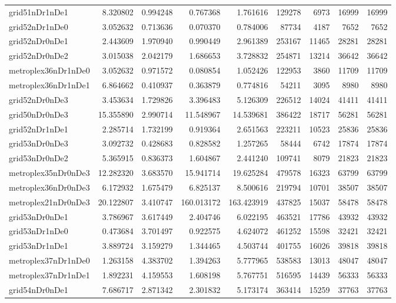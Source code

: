 \documentclass[../../../thesis.tex]{subfiles}
\begin{document}
\begin{longtable}{|l|r|r|r|r|r|r|r|r|}
grid51nDr1nDe1 & 8.320802 & 0.994248 & 0.767368 & 1.761616 & 129278 & 6973 & 16999 & 16999 \\
grid52nDr1nDe0 & 3.052632 & 0.713636 & 0.070370 & 0.784006 & 87734 & 4187 & 7652 & 7652 \\
grid52nDr0nDe1 & 2.443609 & 1.970940 & 0.990449 & 2.961389 & 253167 & 11465 & 28281 & 28281 \\
grid52nDr0nDe2 & 3.015038 & 2.042179 & 1.686653 & 3.728832 & 254871 & 13214 & 36642 & 36642 \\
metroplex36nDr1nDe0 & 3.052632 & 0.971572 & 0.080854 & 1.052426 & 122953 & 3860 & 11709 & 11709 \\
metroplex36nDr1nDe1 & 6.864662 & 0.410937 & 0.363879 & 0.774816 & 54211 & 3095 & 8980 & 8980 \\
grid52nDr0nDe3 & 3.453634 & 1.729826 & 3.396483 & 5.126309 & 226512 & 14024 & 41411 & 41411 \\
grid50nDr0nDe3 & 15.355890 & 2.990714 & 11.548967 & 14.539681 & 386422 & 18717 & 56281 & 56281 \\
grid52nDr1nDe1 & 2.285714 & 1.732199 & 0.919364 & 2.651563 & 223211 & 10523 & 25836 & 25836 \\
grid53nDr0nDe3 & 3.092732 & 0.428683 & 0.828582 & 1.257265 & 58444 & 6742 & 17874 & 17874 \\
grid53nDr0nDe2 & 5.365915 & 0.836373 & 1.604867 & 2.441240 & 109741 & 8079 & 21823 & 21823 \\
metroplex35nDr0nDe3 & 12.282320 & 3.683570 & 15.941714 & 19.625284 & 479578 & 16323 & 63799 & 63799 \\
metroplex36nDr0nDe3 & 6.172932 & 1.675479 & 6.825137 & 8.500616 & 219794 & 10701 & 38507 & 38507 \\
metroplex21nDr0nDe3 & 20.122807 & 3.410747 & 160.013172 & 163.423919 & 437825 & 15037 & 58478 & 58478 \\
grid53nDr0nDe1 & 3.786967 & 3.617449 & 2.404746 & 6.022195 & 463521 & 17786 & 43932 & 43932 \\
grid53nDr1nDe0 & 0.473684 & 3.701497 & 0.922575 & 4.624072 & 461252 & 15598 & 32421 & 32421 \\
grid53nDr1nDe1 & 3.889724 & 3.159279 & 1.344465 & 4.503744 & 401755 & 16026 & 39818 & 39818 \\
metroplex37nDr1nDe0 & 1.263158 & 4.383702 & 1.394263 & 5.777965 & 538583 & 13013 & 48047 & 48047 \\
metroplex37nDr1nDe1 & 1.892231 & 4.159553 & 1.608198 & 5.767751 & 516595 & 14439 & 56333 & 56333 \\
grid54nDr0nDe1 & 7.686717 & 2.871342 & 2.301832 & 5.173174 & 363414 & 15259 & 37763 & 37763 \\

\end{longtable}
\end{document}
